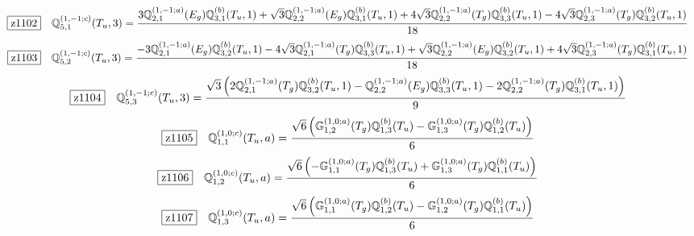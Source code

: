 \documentclass[fleqn,10pt,landscape]{jsarticle}
\begin{document}
\begin{dmath*}
\hspace*{3mm}\fbox{z1102}\quad \mathbb{Q}_{5,1}^{(1,-1;c)}(T_{u},3)=\frac{3 \mathbb{Q}_{2,1}^{(1,-1;a)}(E_{g}) \mathbb{Q}_{3,1}^{(b)}(T_{u},1) + \sqrt{3} \mathbb{Q}_{2,2}^{(1,-1;a)}(E_{g}) \mathbb{Q}_{3,1}^{(b)}(T_{u},1) + 4 \sqrt{3} \mathbb{Q}_{2,2}^{(1,-1;a)}(T_{g}) \mathbb{Q}_{3,3}^{(b)}(T_{u},1) - 4 \sqrt{3} \mathbb{Q}_{2,3}^{(1,-1;a)}(T_{g}) \mathbb{Q}_{3,2}^{(b)}(T_{u},1)}{18}
\end{dmath*}
\begin{dmath*}
\hspace*{3mm}\fbox{z1103}\quad \mathbb{Q}_{5,2}^{(1,-1;c)}(T_{u},3)=\frac{- 3 \mathbb{Q}_{2,1}^{(1,-1;a)}(E_{g}) \mathbb{Q}_{3,2}^{(b)}(T_{u},1) - 4 \sqrt{3} \mathbb{Q}_{2,1}^{(1,-1;a)}(T_{g}) \mathbb{Q}_{3,3}^{(b)}(T_{u},1) + \sqrt{3} \mathbb{Q}_{2,2}^{(1,-1;a)}(E_{g}) \mathbb{Q}_{3,2}^{(b)}(T_{u},1) + 4 \sqrt{3} \mathbb{Q}_{2,3}^{(1,-1;a)}(T_{g}) \mathbb{Q}_{3,1}^{(b)}(T_{u},1)}{18}
\end{dmath*}
\begin{dmath*}
\hspace*{3mm}\fbox{z1104}\quad \mathbb{Q}_{5,3}^{(1,-1;c)}(T_{u},3)=\frac{\sqrt{3} \left(2 \mathbb{Q}_{2,1}^{(1,-1;a)}(T_{g}) \mathbb{Q}_{3,2}^{(b)}(T_{u},1) - \mathbb{Q}_{2,2}^{(1,-1;a)}(E_{g}) \mathbb{Q}_{3,3}^{(b)}(T_{u},1) - 2 \mathbb{Q}_{2,2}^{(1,-1;a)}(T_{g}) \mathbb{Q}_{3,1}^{(b)}(T_{u},1)\right)}{9}
\end{dmath*}
\begin{dmath*}
\hspace*{3mm}\fbox{z1105}\quad \mathbb{Q}_{1,1}^{(1,0;c)}(T_{u},a)=\frac{\sqrt{6} \left(\mathbb{G}_{1,2}^{(1,0;a)}(T_{g}) \mathbb{Q}_{1,3}^{(b)}(T_{u}) - \mathbb{G}_{1,3}^{(1,0;a)}(T_{g}) \mathbb{Q}_{1,2}^{(b)}(T_{u})\right)}{6}
\end{dmath*}
\begin{dmath*}
\hspace*{3mm}\fbox{z1106}\quad \mathbb{Q}_{1,2}^{(1,0;c)}(T_{u},a)=\frac{\sqrt{6} \left(- \mathbb{G}_{1,1}^{(1,0;a)}(T_{g}) \mathbb{Q}_{1,3}^{(b)}(T_{u}) + \mathbb{G}_{1,3}^{(1,0;a)}(T_{g}) \mathbb{Q}_{1,1}^{(b)}(T_{u})\right)}{6}
\end{dmath*}
\begin{dmath*}
\hspace*{3mm}\fbox{z1107}\quad \mathbb{Q}_{1,3}^{(1,0;c)}(T_{u},a)=\frac{\sqrt{6} \left(\mathbb{G}_{1,1}^{(1,0;a)}(T_{g}) \mathbb{Q}_{1,2}^{(b)}(T_{u}) - \mathbb{G}_{1,2}^{(1,0;a)}(T_{g}) \mathbb{Q}_{1,1}^{(b)}(T_{u})\right)}{6}
\end{dmath*}
\end{document}

